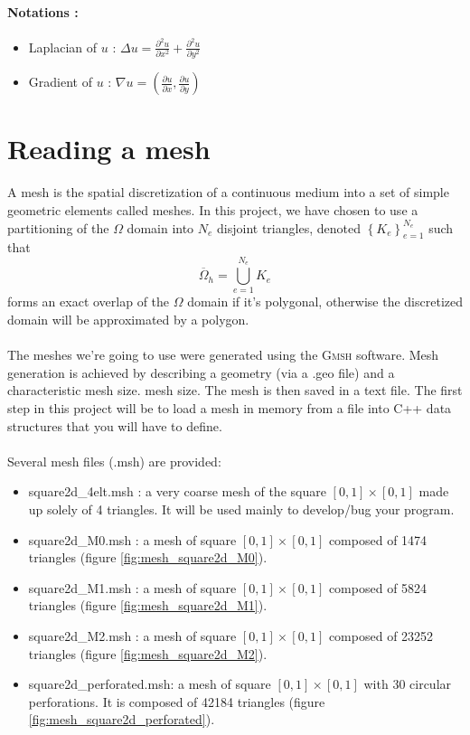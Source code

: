 \documentclass[11pt,a4paper]{article}
\begin{document}
\paragraph{Notations :}
\begin{itemize}
\item Laplacian of $u$ : $\Delta u = \frac{\partial^2 u}{\partial x^2} + \frac{\partial^2 u}{\partial y^2}$
\item Gradient of $u$ : $\nabla u = ( \frac{\partial u}{\partial x}, \frac{\partial u}{\partial y} )$
\end{itemize}


\section{Reading a mesh}
A mesh is the spatial discretization of a continuous medium into a set of simple geometric elements called meshes. In this project, we have chosen
to use a partitioning of the $\Omega$ domain into $N_e$ disjoint triangles, denoted $\left\{ K_e \right\}_{e=1}^{N_e}$ such that
\begin{equation*}
\overline{\Omega}_h = \bigcup_{e=1}^{N_e} K_e
\end{equation*}
forms an exact overlap of the $\Omega$ domain if it's polygonal, otherwise the discretized domain will be approximated by a polygon.

\paragraph{}
The meshes we're going to use were generated using the \textsc{Gmsh} software. Mesh generation is achieved by describing a geometry (via a .geo file) and a characteristic mesh size.
mesh size. The mesh is then saved in a text file. 
The first step in this project will be to load a mesh in memory from a file into C++ data structures that you will have to define.

\paragraph{}
Several mesh files (.msh) are provided:
\begin{itemize}
\item square2d\_4elt.msh : a very coarse mesh of the square $[0,1] \times [0,1]$ made up solely of 4 triangles. It will be used mainly to develop/bug your program.
\item square2d\_M0.msh : a mesh of square $[0,1] \times [0,1]$ composed of 1474 triangles (figure \ref{fig:mesh_square2d_M0}).
\item square2d\_M1.msh : a mesh of square $[0,1] \times [0,1]$ composed of 5824 triangles (figure \ref{fig:mesh_square2d_M1}).
\item square2d\_M2.msh : a mesh of square $[0,1] \times [0,1]$ composed of 23252 triangles (figure \ref{fig:mesh_square2d_M2}).
\item square2d\_perforated.msh: a mesh of square $[0,1] \times [0,1]$ with 30 circular perforations. It is composed of 42184 triangles (figure \ref{fig:mesh_square2d_perforated}).
\end{itemize}
\end{document}
